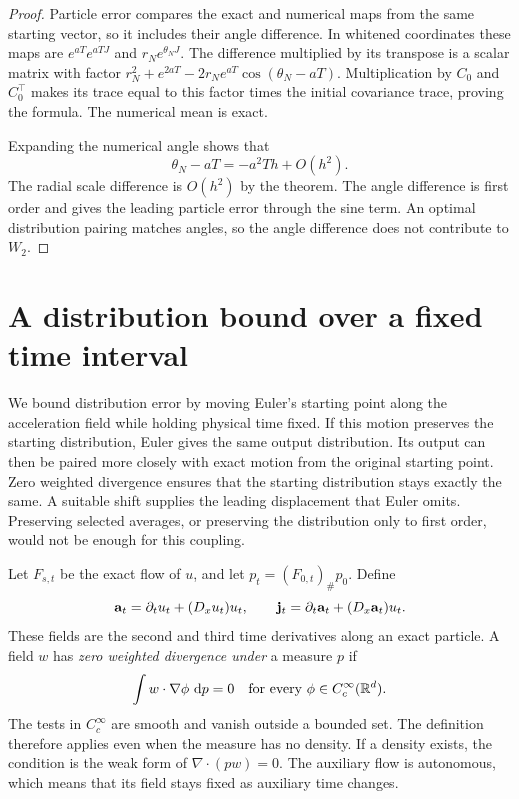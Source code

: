\begin{proof}
Particle error compares the exact and numerical maps from the same starting vector, so it includes their angle difference. In whitened coordinates these maps are $e^{aT}e^{aTJ}$ and $r_Ne^{\theta_NJ}$. The difference multiplied by its transpose is a scalar matrix with factor $r_N^2+e^{2aT}-2r_Ne^{aT}\cos(\theta_N-aT)$. Multiplication by $C_0$ and $C_0^\top$ makes its trace equal to this factor times the initial covariance trace, proving the formula. The numerical mean is exact.

Expanding the numerical angle shows that
\[
 \theta_N-aT=-a^2T h+O(h^2).
\]
The radial scale difference is $O(h^2)$ by the theorem. The angle difference is first order and gives the leading particle error through the sine term. An optimal distribution pairing matches angles, so the angle difference does not contribute to $W_2$.
\end{proof}


\section{A distribution bound over a fixed time interval}
\label{app:general}

We bound distribution error by moving Euler's starting point along the acceleration field while holding physical time fixed. If this motion preserves the starting distribution, Euler gives the same output distribution. Its output can then be paired more closely with exact motion from the original starting point. Zero weighted divergence ensures that the starting distribution stays exactly the same. A suitable shift supplies the leading displacement that Euler omits. Preserving selected averages, or preserving the distribution only to first order, would not be enough for this coupling.

Let $F_{s,t}$ be the exact flow of $u$, and let $p_t=(F_{0,t})_\#p_0$. Define
\[
 \mathbf a_t=\partial_tu_t+(D_xu_t)u_t,
 \qquad \mathbf j_t=\partial_t\mathbf a_t+(D_x\mathbf a_t)u_t.
\]
These fields are the second and third time derivatives along an exact particle. A field $w$ has \emph{zero weighted divergence under} a measure $p$ if
\begin{equation}
 \int w\cdot\nabla\phi\,\,\mathrm d p=0
 \quad\text{for every }\phi\in C_c^\infty(\mathbb R^d).
 \label{eq:appendix-flux-null}
\end{equation}
The tests in $C_c^\infty$ are smooth and vanish outside a bounded set. The definition therefore applies even when the measure has no density. If a density exists, the condition is the weak form of $\nabla\!\cdot(pw)=0$. The auxiliary flow is autonomous, which means that its field stays fixed as auxiliary time changes.

